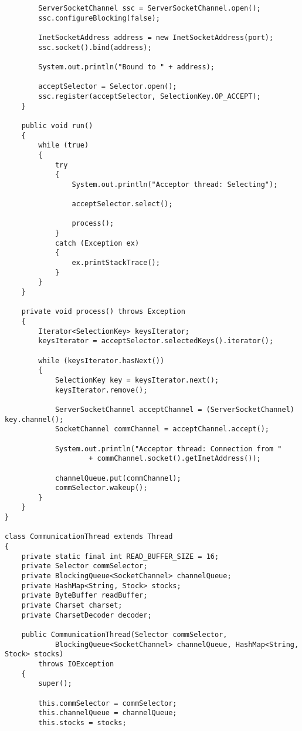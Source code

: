 \documentclass[a4paper,10pt]{article}
\begin{document}
\begin{verbatim}
        ServerSocketChannel ssc = ServerSocketChannel.open();
        ssc.configureBlocking(false);

        InetSocketAddress address = new InetSocketAddress(port);
        ssc.socket().bind(address);

        System.out.println("Bound to " + address);

        acceptSelector = Selector.open();
        ssc.register(acceptSelector, SelectionKey.OP_ACCEPT);
    }

    public void run()
    {
        while (true)
        {
            try
            {
                System.out.println("Acceptor thread: Selecting");

                acceptSelector.select();

                process();
            }
            catch (Exception ex)
            {
                ex.printStackTrace();
            }
        }
    }

    private void process() throws Exception
    {
        Iterator<SelectionKey> keysIterator;
        keysIterator = acceptSelector.selectedKeys().iterator();

        while (keysIterator.hasNext())
        {
            SelectionKey key = keysIterator.next();
            keysIterator.remove();

            ServerSocketChannel acceptChannel = (ServerSocketChannel) key.channel();
            SocketChannel commChannel = acceptChannel.accept();

            System.out.println("Acceptor thread: Connection from "
                    + commChannel.socket().getInetAddress());

            channelQueue.put(commChannel);
            commSelector.wakeup();
        }
    }
}

class CommunicationThread extends Thread
{
    private static final int READ_BUFFER_SIZE = 16;
    private Selector commSelector;
    private BlockingQueue<SocketChannel> channelQueue;
    private HashMap<String, Stock> stocks;
    private ByteBuffer readBuffer;
    private Charset charset;
    private CharsetDecoder decoder;

    public CommunicationThread(Selector commSelector,
            BlockingQueue<SocketChannel> channelQueue, HashMap<String, Stock> stocks)
        throws IOException
    {
        super();

        this.commSelector = commSelector;
        this.channelQueue = channelQueue;
        this.stocks = stocks;


\end{verbatim}
\end{document}
